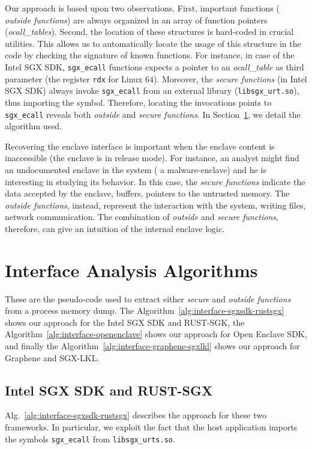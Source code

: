 Our approach is based upon two observations. First, important functions (\eg 
\emph{outside functions}) are always organized in an array of function pointers 
(\eg \emph{ocall\_tables}). 
Second, the location of these structures is hard-coded in 
crucial utilities.
This allows us to automatically locate the usage of
this structure in the code by checking the signature of known functions.
For instance, in case of the Intel SGX SDK, \texttt{sgx\_ecall} functions 
expects a pointer to an \emph{ocall\_table} as third parameter (\ie the register
\texttt{rdx} for Linux $64$).
Moreover, the \emph{secure functions} (in  Intel SGX SDK) always invoke 
\texttt{sgx\_ecall} from an external library (\texttt{libsgx\_urt.so}), thus 
importing the symbol.
Therefore, locating the invocations points to \texttt{sgx\_ecall} reveals 
both \emph{outside} and \emph{secure functions}.
In Section~\ref{apx:interface-analysis}, we detail the algorithm used.

Recovering the enclave interface is important when the enclave content is
inaccessible (\eg the enclave is in release mode). 
For instance, an analyst might find an undocumented enclave in the system (\eg 
a malware-enclave) and he is interesting in studying its behavior.
In this case, the \emph{secure functions} indicate the 
data accepted by the enclave, \eg buffers, pointers to the untrusted memory. 
The \emph{outside functions}, instead, represent the interaction with 
the system, \eg writing files, network communication.
The combination of \emph{outside} and \emph{secure functions}, therefore, can 
give an intuition of the internal enclave logic.

\section{Interface Analysis Algorithms}
\label{apx:interface-analysis}

These are the pseudo-code used to extract either \emph{secure} and 
\emph{outside functions} from a process memory dump.
The Algorithm~\ref{alg:interface-sgxsdk-rustsgx} shows our approach for the 
Intel SGX SDK and RUST-SGK, the Algorithm~\ref{alg:interface-openenclave} shows 
our approach for Open Enclave SDK, and finally the 
Algorithm~\ref{alg:interface-graphene-sgxlkl} shows our approach for Graphene 
and SGX-LKL.

\subsection{Intel SGX SDK and RUST-SGX}
Alg.~\ref{alg:interface-sgxsdk-rustsgx} describes the approach for these two
frameworks.
In particular, we exploit the fact that the host application imports the
symbols \texttt{sgx\_ecall} from \texttt{libsgx\_urts.so}.

